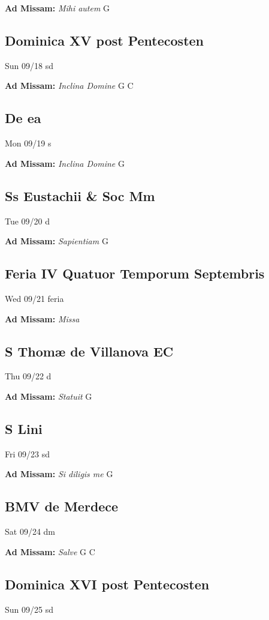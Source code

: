 \documentclass[letterpaper, 10pt, twocolumn]{article}
\begin{document}
\textbf{Ad Missam:} \textit{Mihi autem} G 

\subsection*{Dominica XV post Pentecosten}Sun 09/18 sd

\textbf{Ad Missam:} \textit{Inclina Domine} G C 

\subsection*{De ea}Mon 09/19 s

\textbf{Ad Missam:} \textit{Inclina Domine} G 

\subsection*{Ss Eustachii \& Soc Mm}Tue 09/20 d

\textbf{Ad Missam:} \textit{Sapientiam} G 

\subsection*{Feria IV Quatuor Temporum Septembris}Wed 09/21 feria

\textbf{Ad Missam:} \textit{Missa} 

\subsection*{S Thomæ de Villanova EC}Thu 09/22 d

\textbf{Ad Missam:} \textit{Statuit} G 

\subsection*{S Lini}Fri 09/23 sd

\textbf{Ad Missam:} \textit{Si diligis me} G 

\subsection*{BMV de Merdece}Sat 09/24 dm

\textbf{Ad Missam:} \textit{Salve} G C 

\subsection*{Dominica XVI post Pentecosten}Sun 09/25 sd
\end{document}
